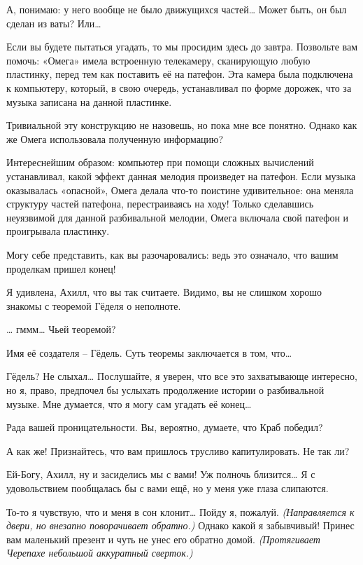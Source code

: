\documentclass[../main.tex]{subfiles}
\begin{document}
\begin{dialogue}
 А, понимаю: у него вообще не было движущихся частей\ldots{} Может быть, он был сделан из ваты? Или\ldots{}

 Если вы будете пытаться угадать, то мы просидим здесь до завтра. Позвольте вам помочь: «Омега» имела встроенную телекамеру, сканирующую любую пластинку, перед тем как поставить её на патефон. Эта камера была подключена к компьютеру, который, в свою очередь, устанавливал по форме дорожек, что за музыка записана на данной пластинке.

 Тривиальной эту конструкцию не назовешь, но пока мне все понятно. Однако как же Омега использовала полученную информацию?

 {\Large И}нтереснейшим образом: компьютер при помощи сложных вычислений устанавливал, какой эффект данная мелодия произведет на патефон. Если музыка оказывалась «опасной», Омега делала что-то поистине удивительное: она меняла структуру частей патефона, перестраиваясь на ходу! Только сделавшись неуязвимой для данной разбивальной мелодии, Омега включала свой патефон и проигрывала пластинку.

 Могу себе представить, как вы разочаровались: ведь это означало, что вашим проделкам пришел конец!

 Я удивлена, Ахилл, что вы так считаете. Видимо, вы не слишком хорошо знакомы с теоремой Гёделя о неполноте.

 \ldots{} гммм\ldots{} Чьей теоремой?

 {\Large И}мя её создателя \--- Гёдель. Суть теоремы заключается в том, что\ldots{}

 Гёдель? Не слыхал\ldots{} Послушайте, я уверен, что все это захватывающе интересно, но я, право, предпочел бы услыхать продолжение истории о разбивальной музыке. Мне думается, что я могу сам угадать её конец\ldots{}

 Рада вашей проницательности. Вы, вероятно, думаете, что Краб победил?

 А как же! Признайтесь, что вам пришлось трусливо капитулировать. Не так ли?

 Ей-Богу, Ахилл, ну и засиделись мы с вами! Уж полночь близится\ldots{} Я с удовольствием пообщалась бы с вами ещё, но у меня уже глаза слипаются.

 То-то я чувствую, что и меня в сон клонит\ldots{} Пойду я, пожалуй. \emph{(Направляется к двери, но внезапно поворачивает обратно.)} Однако какой я забывчивый! Принес вам маленький презент и чуть не унес его обратно домой. \emph{(Протягивает Черепахе небольшой аккуратный сверток.)}


\end{dialogue}
\end{document}
